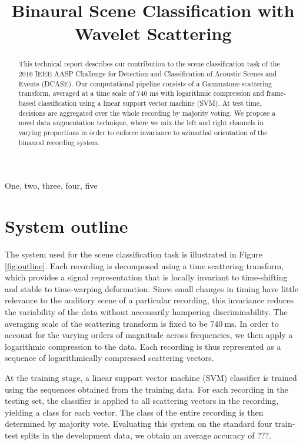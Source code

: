\documentclass{article}
\title{Binaural Scene Classification with Wavelet Scattering}
\begin{document}
\ninept
\maketitle

\begin{sloppy}

\begin{abstract}
This technical report describes our contribution to the scene classification task of the 2016 IEEE AASP Challenge for Detection and Classification of Acoustic Scenes and Events (DCASE). Our computational pipeline consists of a Gammatone scattering transform, averaged at a time scale of 740 ms with logarithmic compression and frame-based classification using a linear support vector machine (SVM). At test time, decisions are aggregated over the whole recording by majority voting. We propose a novel data augmentation technique, where we mix the left and right channels in varying proportions in order to enforce invariance to azimuthal orientation of the binaural recording system.
\end{abstract}

\begin{keywords}
One, two, three, four, five
\end{keywords}

\section{System outline}
\label{sec:outline}

The system used for the scene classification task is illustrated in Figure \ref{fig:outline}. Each recording is decomposed using a time scattering transform, which provides a signal representation that is locally invariant to time-shifting and stable to time-warping deformation. Since small changes in timing have little relevance to the auditory scene of a particular recording, this invariance reduces the variability of the data without necessarily hampering discriminability. The averaging scale of the scattering transform is fixed to be $740~\mathrm{ms}$. In order to account for the varying orders of magnitude across frequencies, we then apply a logarithmic compression to the data. Each recording is thus represented as a sequence of logarithmically compressed scattering vectors.

At the training stage, a linear support vector machine (SVM) classifier is trained using the sequences obtained from the training data. For each recording in the testing set, the classifier is applied to all scattering vectors in the recording, yielding a class for each vector. The class of the entire recording is then determined by majority vote. Evaluating this system on the standard four train-test splits in the development data, we obtain an average accuracy of ???.


\end{sloppy}
\end{document}

